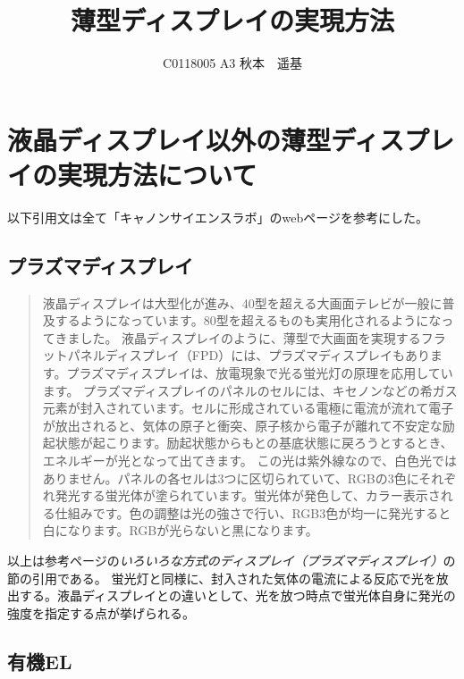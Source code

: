 \documentclass[uplatex]{jsarticle} %
\title{薄型ディスプレイの実現方法}
\author{C0118005 A3 秋本　遥基}
\date{}
\begin{document}
\maketitle


\section{液晶ディスプレイ以外の薄型ディスプレイの実現方法について}

  以下引用文は全て「キャノンサイエンスラボ」のwebページを参考にした。\cite{sour}\\

\subsection{プラズマディスプレイ}

\begin{quotation}

  液晶ディスプレイは大型化が進み、40型を超える大画面テレビが一般に普及するようになっています。80型を超えるものも実用化されるようになってきました。
液晶ディスプレイのように、薄型で大画面を実現するフラットパネルディスプレイ（FPD）には、プラズマディスプレイもあります。プラズマディスプレイは、放電現象で光る蛍光灯の原理を応用しています。
プラズマディスプレイのパネルのセルには、キセノンなどの希ガス元素が封入されています。セルに形成されている電極に電流が流れて電子が放出されると、気体の原子と衝突、原子核から電子が離れて不安定な励起状態が起こります。励起状態からもとの基底状態に戻ろうとするとき、エネルギーが光となって出てきます。
この光は紫外線なので、白色光ではありません。パネルの各セルは3つに区切られていて、RGBの3色にそれぞれ発光する蛍光体が塗られています。蛍光体が発色して、カラー表示される仕組みです。色の調整は光の強さで行い、RGB3色が均一に発光すると白になります。RGBが光らないと黒になります。

\end{quotation}

以上は参考ページ\cite{sour}の\textit{いろいろな方式のディスプレイ（プラズマディスプレイ）}の節の引用である。
蛍光灯と同様に、封入された気体の電流による反応で光を放出する。液晶ディスプレイとの違いとして、光を放つ時点で蛍光体自身に発光の強度を指定する点が挙げられる。

\subsection{有機EL}
\end{document}
